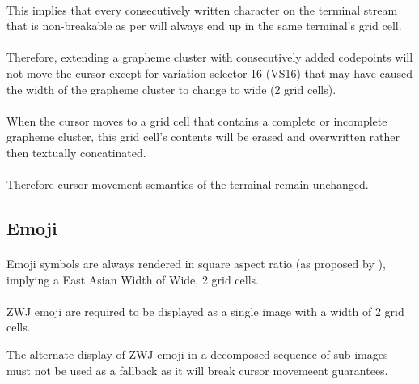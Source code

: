 \documentclass{article}
\begin{document}
\paragraph*{}
This implies that every consecutively written character on the terminal
stream that is non-breakable as per \cite{UTS-29} will
always end up in the same terminal's grid cell.

\paragraph*{}
Therefore, extending a grapheme cluster with consecutively added codepoints
will not move the cursor except for variation selector 16 (VS16) that may
have caused the width of the grapheme cluster to change to wide (2 grid cells).

\paragraph*{}
When the cursor moves to a grid cell that contains a complete or incomplete
grapheme cluster, this grid cell's contents will be erased and overwritten
rather then textually concatinated.

\paragraph*{}
Therefore cursor movement semantics of the terminal remain unchanged.

\subsection{Emoji}

\paragraph*{}
Emoji symbols are always rendered in square aspect ratio
(as proposed by \cite{UTS-51}),
implying a East Asian Width \cite{UTS-11} of Wide, 2 grid cells.

\paragraph*{}
ZWJ emoji are required to be displayed as a single image with a width of 2 grid cells.

The alternate display of ZWJ emoji in a decomposed sequence of sub-images
must not be used as a fallback as it will break cursor movemeent guarantees.
\end{document}
